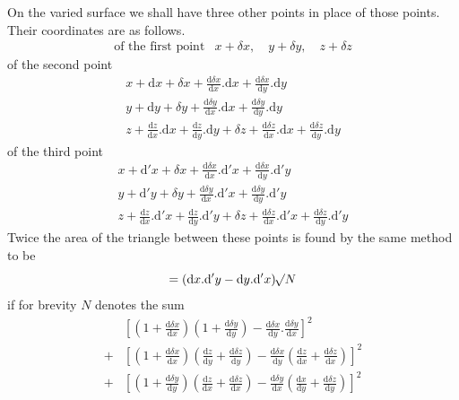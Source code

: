 On the varied surface we shall have three other points in place of those points. Their coordinates are as follows.
\[
\begin{array}{ll}
\text{of the first point}&x+\delta x,\quad y+\delta y,\quad z+\delta z
\end{array}
\]
of the second point
\[
\begin{gathered}
x+\mathrm{d}x+\delta x+\frac{\mathrm{d}\delta x}{\mathrm{d}x}.\mathrm{d}x+\frac{\mathrm{d}\delta x}{\mathrm{d}y}.\mathrm{d}y\\
y+\mathrm{d}y+\delta y+\frac{\mathrm{d}\delta y}{\mathrm{d}x}.\mathrm{d}x+\frac{\mathrm{d}\delta y}{\mathrm{d}y}.\mathrm{d}y\\
z+\frac{\mathrm{d}z}{\mathrm{d}x}.\mathrm{d}x+\frac{\mathrm{d}z}{\mathrm{d}y}.\mathrm{d}y+\delta z+\frac{\mathrm{d}\delta z}{\mathrm{d}x}.\mathrm{d}x+\frac{\mathrm{d}\delta z}{\mathrm{d}y}.\mathrm{d}y
\end{gathered}
\]
of the third point
\[
\begin{gathered}
x+\mathrm{d}'x+\delta x+\frac{\mathrm{d}\delta x}{\mathrm{d}x}.\mathrm{d}'x+\frac{\mathrm{d}\delta x}{\mathrm{d}y}.\mathrm{d}'y\\
y+\mathrm{d}'y+\delta y+\frac{\mathrm{d}\delta y}{\mathrm{d}x}.\mathrm{d}'x+\frac{\mathrm{d}\delta y}{\mathrm{d}y}.\mathrm{d}'y\\
z+\frac{\mathrm{d}z}{\mathrm{d}x}.\mathrm{d}'x+\frac{\mathrm{d}z}{\mathrm{d}y}.\mathrm{d}'y+\delta z+\frac{\mathrm{d}\delta z}{\mathrm{d}x}.\mathrm{d}'x+\frac{\mathrm{d}\delta z}{\mathrm{d}y}.\mathrm{d}'y
\end{gathered}
\]
Twice the area of the triangle between these points is found by the same method to be
\[
=(\mathrm{d}x.\mathrm{d}'y-\mathrm{d}y.\mathrm{d}'x)\mathord{{}^{}\!\surd}N
\]
if for brevity $N$ denotes the sum
\[
\begin{aligned}
&[(1+\frac{\mathrm{d}\delta x}{\mathrm{d}x})(1+\frac{\mathrm{d}\delta y}{\mathrm{d}y})-\frac{\mathrm{d}\delta x}{\mathrm{d}y}.\frac{\mathrm{d}\delta y}{\mathrm{d}x}]^2\\
+&[(1+\frac{\mathrm{d}\delta x}{\mathrm{d}x})(\frac{\mathrm{d}z}{\mathrm{d}y}+\frac{\mathrm{d}\delta z}{\mathrm{d}y})-\frac{\mathrm{d}\delta x}{\mathrm{d}y}(\frac{\mathrm{d}z}{\mathrm{d}x}+\frac{\mathrm{d}\delta z}{\mathrm{d}x})]^2\\
+&[(1+\frac{\mathrm{d}\delta y}{\mathrm{d}y})(\frac{\mathrm{d}z}{\mathrm{d}x}+\frac{\mathrm{d}\delta z}{\mathrm{d}x})-\frac{\mathrm{d}\delta y}{\mathrm{d}x}(\frac{\mathrm{d}x}{\mathrm{d}y}+\frac{\mathrm{d}\delta z}{\mathrm{d}y})]^2
\end{aligned}
\]
